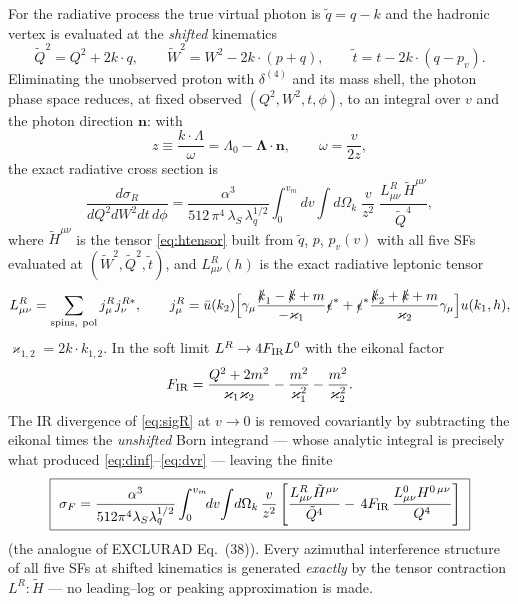 \documentclass[11pt]{article}
\begin{document}
For the radiative process the true virtual photon is $\tilde q=q-k$ and the
hadronic vertex is evaluated at the \emph{shifted} kinematics
\begin{equation}
\tilde Q^2=Q^2+2k\!\cdot\!q,\qquad
\tilde W^2=W^2-2k\!\cdot\!(p+q),\qquad
\tilde t=t-2k\!\cdot\!(q-p_v).
\label{eq:shifted}
\end{equation}
Eliminating the unobserved proton with
$\delta^{(4)}$ and its mass shell, the photon phase space reduces, at fixed
observed $(Q^2,W^2,t,\phi)$, to an integral over $v$ and the photon
direction $\bm n$: with
\begin{equation}
z\equiv \frac{k\cdot\Lambda}{\omega}=\Lambda_0-\bm\Lambda\!\cdot\!\bm n,
\qquad \omega=\frac{v}{2z},
\end{equation}
the exact radiative cross section is
\begin{equation}
\frac{d\sigma_R}{dQ^2dW^2dt\,d\phi}
=\frac{\alpha^3}{512\,\pi^4\,\lambda_S\,\lambda_q^{1/2}}
\int_0^{v_m}\!dv\int d\Omega_k\;
\frac{v}{z^2}\;
\frac{L^R_{\mu\nu}\,\tilde H^{\mu\nu}}{\tilde Q^4},
\label{eq:sigR}
\end{equation}
where $\tilde H^{\mu\nu}$ is the tensor \eqref{eq:htensor} built from
$\tilde q$, $p$, $p_v(v)$ with all five SFs evaluated at
$(\tilde W^2,\tilde Q^2,\tilde t)$, and $L^R_{\mu\nu}(h)$ is the exact
radiative leptonic tensor
\begin{equation}
L^R_{\mu\nu}=\sum_{\rm spins,\ pol}j^R_\mu j^{R*}_\nu,\qquad
j^R_\mu=\bar u(k_2)\Big[\gamma_\mu\frac{\slashed k_1-\slashed k+m}{-\varkappa_1}
\slashed\epsilon^*
+\slashed\epsilon^*\frac{\slashed k_2+\slashed k+m}{\varkappa_2}\gamma_\mu
\Big]u(k_1,h),
\end{equation}
$\varkappa_{1,2}=2k\!\cdot\!k_{1,2}$. In the soft limit
$L^R\to 4F_{\rm IR}L^0$ with the eikonal factor
\begin{equation}
F_{\rm IR}=\frac{Q^2+2m^2}{\varkappa_1\varkappa_2}
-\frac{m^2}{\varkappa_1^2}-\frac{m^2}{\varkappa_2^2}.
\end{equation}
The IR divergence of \eqref{eq:sigR} at $v\to0$ is removed covariantly by
subtracting the eikonal times the \emph{unshifted} Born integrand --- whose
analytic integral is precisely what produced
\eqref{eq:dinf}--\eqref{eq:dvr} --- leaving the finite
\begin{equation}
\boxed{\ \sigma_F=\frac{\alpha^3}{512\pi^4\lambda_S\lambda_q^{1/2}}
\int_0^{v_m}\!\!dv\!\int\! d\Omega_k\,\frac{v}{z^2}
\left[\frac{L^R_{\mu\nu}\tilde H^{\mu\nu}}{\tilde Q^4}
-\,4F_{\rm IR}\,\frac{L^0_{\mu\nu}H^{0\,\mu\nu}}{Q^4}\right] \ }
\label{eq:sigF}
\end{equation}
(the analogue of EXCLURAD Eq.~(38)). Every azimuthal interference structure
of all five SFs at shifted kinematics is generated \emph{exactly} by the
tensor contraction $L^R\!:\!\tilde H$ --- no leading--log or peaking
approximation is made.
\end{document}
